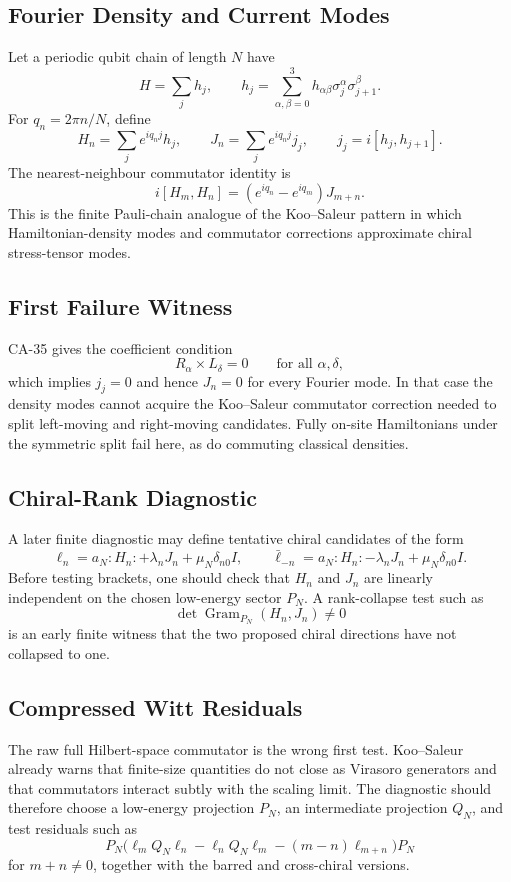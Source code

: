 \subsection{Fourier Density and Current Modes}

Let a periodic qubit chain of length \(N\) have
\[
  H=\sum_j h_j,\qquad
  h_j=\sum_{\alpha,\beta=0}^3
  h_{\alpha\beta}\sigma_j^\alpha\sigma_{j+1}^\beta.
\]
For \(q_n=2\pi n/N\), define
\[
  H_n=\sum_j e^{iq_nj}h_j,\qquad
  J_n=\sum_j e^{iq_nj}j_j,\qquad
  j_j=i[h_j,h_{j+1}].
\]
The nearest-neighbour commutator identity is
\[
  i[H_m,H_n]
  =
  (e^{iq_n}-e^{iq_m})J_{m+n}.
\]
This is the finite Pauli-chain analogue of the Koo--Saleur pattern in which
Hamiltonian-density modes and commutator corrections approximate chiral
stress-tensor modes.

\subsection{First Failure Witness}

CA-35 gives the coefficient condition
\[
  R_\alpha\times L_\delta=0
  \qquad\text{for all }\alpha,\delta,
\]
which implies \(j_j=0\) and hence \(J_n=0\) for every Fourier mode.  In that
case the density modes cannot acquire the Koo--Saleur commutator correction
needed to split left-moving and right-moving candidates.  Fully on-site
Hamiltonians under the symmetric split fail here, as do commuting classical
densities.

\subsection{Chiral-Rank Diagnostic}

A later finite diagnostic may define tentative chiral candidates of the form
\[
  \ell_n=a_N{:}H_n{:}+\lambda_nJ_n+\mu_N\delta_{n0}I,\qquad
  \bar\ell_{-n}=a_N{:}H_n{:}-\lambda_nJ_n+\mu_N\delta_{n0}I.
\]
Before testing brackets, one should check that \(H_n\) and \(J_n\) are
linearly independent on the chosen low-energy sector \(P_N\).  A rank-collapse
test such as
\[
  \det \operatorname{Gram}_{P_N}(H_n,J_n)\ne0
\]
is an early finite witness that the two proposed chiral directions have not
collapsed to one.

\subsection{Compressed Witt Residuals}

The raw full Hilbert-space commutator is the wrong first test.  Koo--Saleur
already warns that finite-size quantities do not close as Virasoro generators
and that commutators interact subtly with the scaling limit.  The diagnostic
should therefore choose a low-energy projection \(P_N\), an intermediate
projection \(Q_N\), and test residuals such as
\[
  P_N\bigl(\ell_mQ_N\ell_n-\ell_nQ_N\ell_m
  -(m-n)\ell_{m+n}\bigr)P_N
\]
for \(m+n\ne0\), together with the barred and cross-chiral versions.

